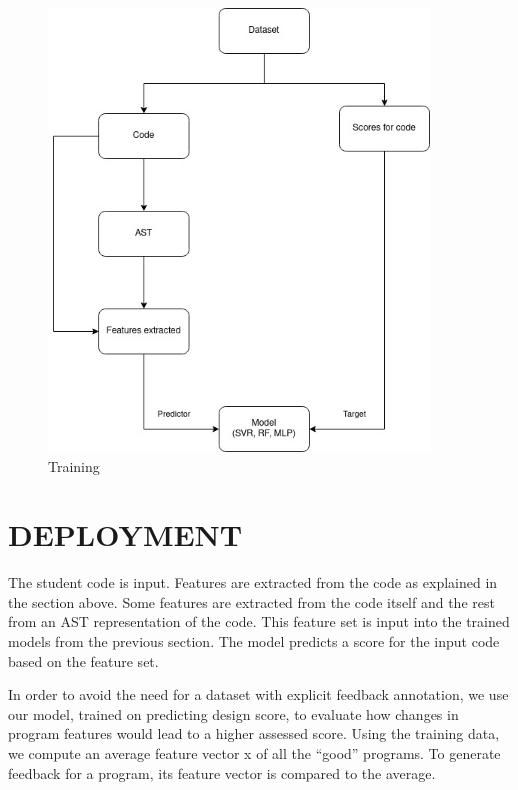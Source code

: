 \begin{figure}[h]
\centering
\includegraphics[width=0.9\textwidth]{./training.jpg}
\caption{Training}
\label{fig1}
\end{figure}

\newpage

\section{DEPLOYMENT} 

The student code is input. Features are extracted from the code as explained in the section above. Some features are extracted from the code itself and the rest from an AST representation of the code. This feature set is input into the trained models from the previous section. The model predicts a score for the input code based on the feature set.

In order to avoid the need for a dataset with explicit feedback annotation, we use our model, trained on predicting design score, to evaluate how changes in program features would lead to a higher assessed score. Using the training data, we compute an average feature vector x of all the “good” programs. To generate feedback for a program, its feature vector is compared to the average.

